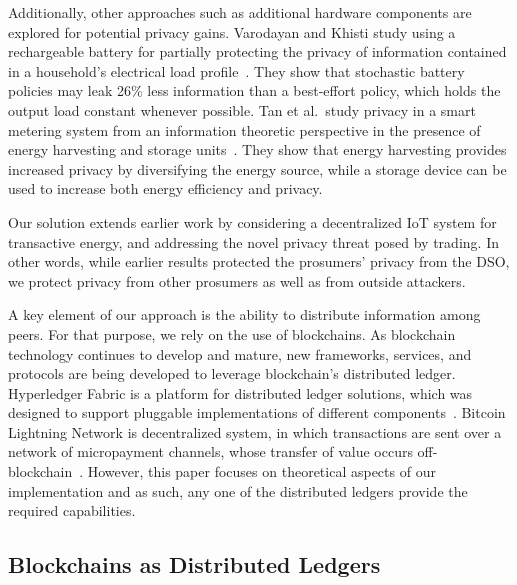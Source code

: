 Additionally, other approaches such as additional hardware components are explored for potential privacy gains. Varodayan and Khisti study using a rechargeable battery for partially protecting the privacy of information contained in a household's electrical load profile~\cite{varodayan2011smart}. They show that stochastic battery policies may leak 26\% less information than a best-effort policy, which holds the output load constant whenever possible. Tan et al.\ study privacy in a smart metering system from an information theoretic perspective in the presence of energy harvesting and storage units~\cite{tan2013increasing}. They show that energy harvesting provides increased privacy by diversifying the energy source, while a storage device can be used to increase both energy efficiency and privacy. %

Our solution extends earlier work by considering a decentralized IoT system for transactive energy, and addressing the novel privacy threat posed by trading. In other words, while earlier results protected the prosumers' privacy from the DSO, we protect privacy from other prosumers as well as from outside attackers. 

A key element of our approach is the ability to distribute information among peers. For that purpose, we rely on the use of blockchains. 
As blockchain technology continues to develop and mature, new frameworks, services, and protocols are being developed to leverage blockchain's distributed ledger. Hyperledger Fabric is a platform for distributed ledger solutions, which was designed to support pluggable implementations of different components~\cite{hyperledger2017fabric}. Bitcoin Lightning Network is decentralized system, in which transactions are sent over a network of micropayment channels, whose transfer of value occurs off-blockchain~\cite{poon2016bitcoin}. However, this paper focuses on theoretical aspects of our implementation and as such, any one of the distributed ledgers provide the required capabilities.


\iffalse
\subsection{Blockchains as Distributed Ledgers}


